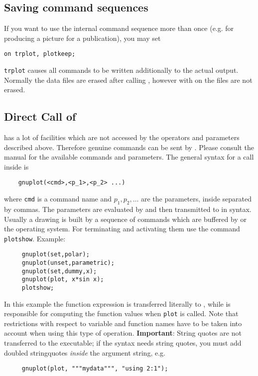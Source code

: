 \subsection{Saving {\Gnuplot} command sequences}
\hypertarget{switch:TRPLOT}{}
\hypertarget{switch:PLOTKEEP}{}
If you want to use the internal {\Gnuplot} command sequence more than once
(e.g. for producing a picture for a publication), you may set
\begin{verbatim}
on trplot, plotkeep;
\end{verbatim}
\texttt{trplot} causes all {\Gnuplot} commands to be written additionally to the
actual {\REDUCE} output.  Normally the data files are erased after calling
{\Gnuplot}, however with  on the files are not erased.


\subsection{Direct Call of {\Gnuplot}}

{\Gnuplot} has a lot of facilities which are not accessed by the operators and
parameters described above. Therefore genuine {\Gnuplot} commands can be sent by
{\REDUCE}.  Please consult the {\Gnuplot} manual for the available commands and
parameters. The general syntax for a {\Gnuplot} call inside {\REDUCE} is
\begin{verbatim}
    gnuplot(<cmd>,<p_1>,<p_2> ...)
\end{verbatim}
where \texttt{cmd} is a command name and $p_1,p_2, \ldots$ are the parameters,
inside {\REDUCE} separated by commas. The parameters are evaluated by {\REDUCE}
and then transmitted to {\Gnuplot} in {\Gnuplot} syntax. Usually a drawing is built by
a sequence of commands which are buffered by {\REDUCE} or the operating
system. For terminating and activating them use the {\REDUCE}
command \texttt{plotshow}.  Example:
\begin{verbatim}
     gnuplot(set,polar);
     gnuplot(unset,parametric);
     gnuplot(set,dummy,x);
     gnuplot(plot, x*sin x);
     plotshow;
\end{verbatim}
In this example the function expression is transferred literally to {\Gnuplot},
while {\REDUCE} is responsible for computing the function values
when \texttt{plot} is called.  Note that {\Gnuplot} restrictions with respect to
variable and function names have to be taken into account when using this type
of operation. \textbf{Important}: String quotes are not transferred to the {\Gnuplot}
executable; if the {\Gnuplot} syntax needs string quotes, you must add doubled
stringquotes \emph{inside} the argument string, e.g.
\begin{verbatim}
     gnuplot(plot, """mydata""", "using 2:1");
\end{verbatim}


